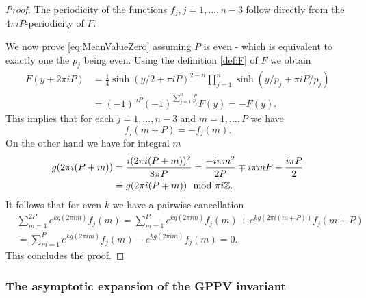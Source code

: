 \begin{proof}
The periodicity of the functions $f_j,j=1,...,n-3$ follow directly from the $4\pi i P$-periodicity of $F$. 

We now prove  \eqref{eq:MeanValueZero} assuming $P$ is even - which is equivalent to exactly one the $p_j$ being even. Using the definition \eqref{def:F} of $F$ we obtain
\begin{align}
F(y + 2\pi iP)&=\frac{1}{4} \sinh(y/2 + \pi i P)^{2-n} \prod_{j=1}^{n} \sinh(y/p_j +\pi i P/p_j) 
\\ &= (-1)^{nP} (-1)^{\sum_{j=1}^n \frac{P}{p_j}} F(y)=-F(y).
\end{align}
This implies that for each $j=1,...,n-3$ and $m=1,...,P$ we have
\begin{equation} f_j(m+P)=-f_j(m). \end{equation}
On the other hand we have for integral $m$
\begin{align}
g(2\pi i(P + m))&=\frac{i(2\pi i(P+ m))^2}{8\pi P}= \frac{-i\pi m^2}{2P}\mp i\pi mP-\frac{i\pi P}{2} 
\\ &=g(2\pi i(P\mp m)) \mod \pi i \mathbb{Z}.
\end{align} It follows that for even $k$ we have a pairwise cancellation
\begin{align}
&\sum_{m=1}^{2P} e^{kg(2\pi i m)} f_j(m)= \sum_{m=1}^{P} e^{kg(2\pi i m)} f_j(m)+e^{kg(2\pi i (m+P))} f_j(m+P)
\\&=\sum_{m=1}^{P} e^{kg(2\pi i m)} f_j(m)- e^{kg(2\pi i m)} f_j(m)=0.
\end{align} This concludes the proof. \end{proof}

\subsubsection{The asymptotic expansion of the GPPV invariant}


